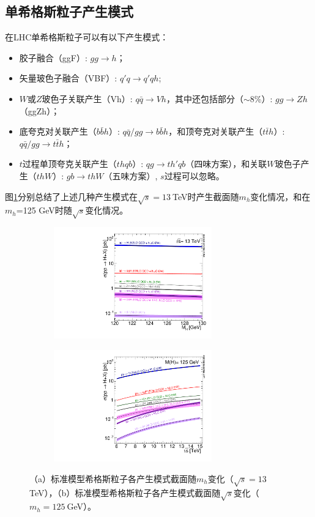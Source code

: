 \subsection{单希格斯粒子产生模式}
在LHC单希格斯粒子可以有以下产生模式：
\begin{itemize}
 \item 胶子融合（ggF）: $gg\rightarrow h$；
 \item 矢量玻色子融合（VBF）: $q\prime{q}\rightarrow q\prime{q}h$;
 \item $W$或$Z$玻色子关联产生（Vh）: $q\bar{q}\rightarrow Vh$，其中还包括部分（$\sim$8\%）: $gg\rightarrow Zh$（ggZh）；
 \item 底夸克对关联产生（$b\bar{b}h$）: $q\bar{q}/gg\rightarrow b\bar{b}h$，和顶夸克对关联产生（$t\bar{t}h$）: $q\bar{q}/gg\rightarrow t\bar{t}h$；
 \item $t$过程单顶夸克关联产生（$thqb$）: $qg\rightarrow th\prime{q}b$（四味方案），和关联$W$玻色子产生（$thW$）: $gb\rightarrow thW$（五味方案）, $s$过程可以忽略。
\end{itemize}
图\ref{fig:LHCHIGGSWG}分别总结了上述几种产生模式在$\sqrt{s}=13~$TeV时产生截面随$m_h$变化情况，和在$m_h$=125 GeV时随$\sqrt{s}$变化情况。
\begin{figure}[h]
\centering
 \begin{subfigure}[b]{0.45\textwidth}
  \includegraphics[width=0.75\textwidth,angle=-90]{fig/plot_13tev_H_sqrt.pdf}
  \caption{}
 \end{subfigure}
 \begin{subfigure}[b]{0.45\textwidth}
  \includegraphics[width=0.75\textwidth,angle=-90]{fig/Plot_Escan_H125_new_sqrt.pdf}
  \caption{}
 \end{subfigure}
\caption{（a）标准模型希格斯粒子各产生模式截面随$m_h$变化（$\sqrt{s}=13~$TeV），（b）标准模型希格斯粒子各产生模式截面随$\sqrt{s}$变化（$m_h=125~$GeV）。}
\label{fig:LHCHIGGSWG}
\end{figure}
